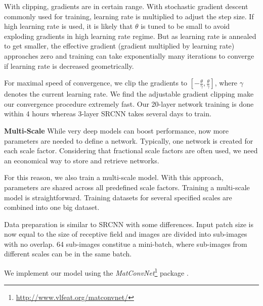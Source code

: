 \documentclass[10pt,twocolumn,letterpaper]{article}
\begin{document}
With clipping, gradients are in certain range. With stochastic gradient descent commonly used for training, learning rate is multiplied to adjust the step size. If high learning rate is used, it is likely that $\theta$ is tuned to be small to avoid exploding gradients in high learning rate regime. But as learning rate is annealed to get smaller, the effective gradient (gradient multiplied by learning rate) approaches zero and training can take exponentially many iterations to converge if learning rate is decreased geometrically.

For maximal speed of convergence, we clip the gradients to $[-\frac{\theta}{\gamma}, \frac{\theta}{\gamma}]$, where $\gamma$ denotes the current learning rate. We find the adjustable gradient clipping make our convergence procedure extremely fast. Our 20-layer network training is done within 4 hours whereas 3-layer SRCNN takes several days to train. 


\textbf{Multi-Scale} While very deep models can boost performance, now more parameters are needed to define a network. Typically, one network is created for each scale factor. Considering that fractional scale factors are often used, we need an economical way to store and retrieve networks.

For this reason, we also train a multi-scale model. With this approach, parameters are shared across all predefined scale factors. Training a multi-scale model is straightforward. Training datasets for several specified scales are combined into one big dataset.

Data preparation is similar to SRCNN \cite{Dong2014} with some differences. Input patch size is now equal to the size of receptive field and images are divided into sub-images with no overlap. 64 sub-images constitue a mini-batch, where sub-images from different scales can be in the same batch.

We implement our model using the \textit{MatConvNet}\footnote{\url{ http://www.vlfeat.org/matconvnet/}} package \cite{arXiv:1412.4564}.
\end{document}
